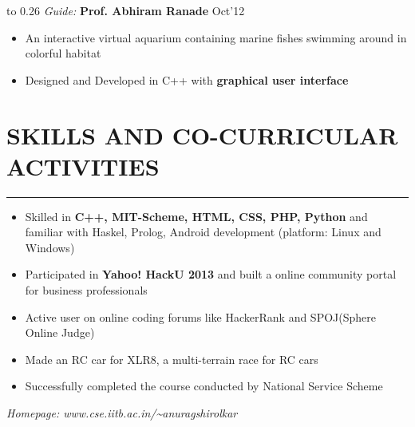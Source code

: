 \documentclass[11pt]{book} %
\begin{document}
\noindent\hbox to 0.26 \hfill \textit{Guide:} \textbf{Prof. Abhiram Ranade} \hfill Oct'12

\vspace{-2mm}
\begin{itemize}
\itemsep-0.1em
\item An interactive virtual aquarium containing marine fishes swimming around in colorful habitat
\item Designed and Developed in C++ with \textbf{graphical user interface}
\end{itemize}
\vspace{-8mm}


\section*{SKILLS AND CO-CURRICULAR ACTIVITIES}
\vspace{-2mm}
\hrule
\medskip
\begin{itemize}
\itemsep-0.3em
\item Skilled in \textbf{C++, MIT-Scheme, HTML, CSS, PHP, Python} and familiar with Haskel, Prolog, Android
development (platform: Linux and Windows)
\item Participated in \textbf{Yahoo! HackU 2013} and built a online community portal for business professionals
\item Active user on online coding forums like HackerRank and SPOJ(Sphere Online Judge)
\item Made an RC car for XLR8, a multi-terrain race for RC cars
\item Successfully completed the course conducted by National Service Scheme
\end{itemize}
\textit{Homepage: www.cse.iitb.ac.in/\textasciitilde anuragshirolkar}
\end{document}
